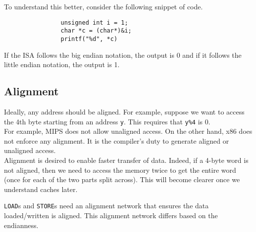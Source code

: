 \documentclass{article}
\begin{document}
			To understand this better, consider the following snippet of code.

			\begin{verbatim}
				unsigned int i = 1;
				char *c = (char*)&i;
				printf("%d", *c)
			\end{verbatim}

			If the ISA follows the big endian notation, the output is 0 and if it follows the little endian notation, the output is 1.

		\subsection{Alignment}

			Ideally, any address should be aligned. For example, suppose we want to access the 4th byte starting from an address \texttt{y}. This requires that \texttt{y\%4} is 0.\\
			For example, MIPS does not allow unaligned access. On the other hand, x86 does not enforce any alignment. It is the compiler's duty to generate aligned or unaligned access.\\
			Alignment is desired to enable faster transfer of data. Indeed, if a 4-byte word is not aligned, then we need to access the memory twice to get the entire word (once for each of the two parts split across). This will become clearer once we understand caches later.

			\texttt{LOAD}s and \texttt{STORE}s need an alignment network that ensures the data loaded/written is aligned. This alignment network differs based on the endianness.
\end{document}

